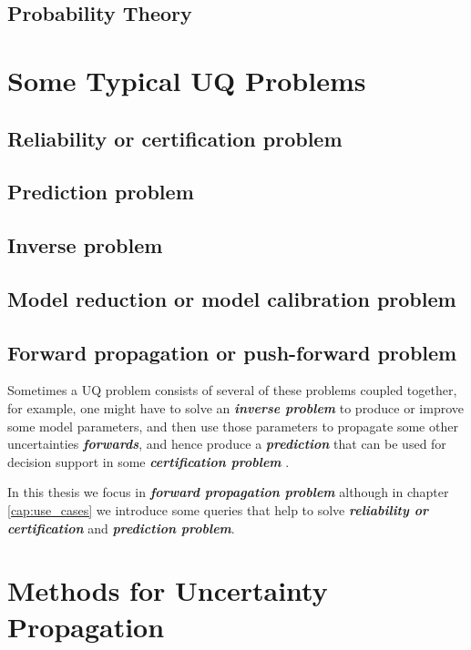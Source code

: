 \subsection{Probability Theory}

\section{Some Typical UQ Problems}
\cite{Sullivan2015}
\subsection{Reliability or certification problem}

\subsection{Prediction problem}
\subsection{Inverse problem}
\subsection{Model reduction or model calibration problem}
\subsection{Forward propagation or push-forward problem}

Sometimes a UQ problem consists of several of these problems coupled together, for example, one might have to solve an \textbf{\textit{inverse problem}} to produce or improve some model parameters, and then use those parameters to propagate some other uncertainties \textbf{\textit{forwards}}, and hence produce a \textbf{\textit{prediction}} that can be used for decision support in some \textbf{\textit{certification problem}} \cite{Sullivan2015}.

In this thesis we focus in \textbf{\textit{forward propagation problem}} although in chapter \ref{cap:use_cases} we introduce some queries that help to solve \textbf{\textit{reliability or certification}} and \textbf{\textit{prediction problem}}.



\section{Methods for Uncertainty Propagation}

